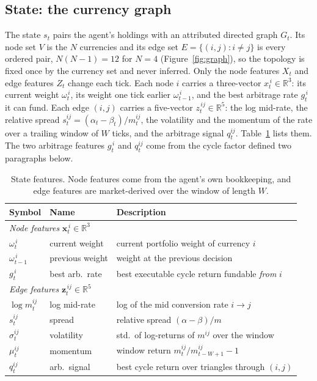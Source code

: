 \documentclass[12pt,a4paper]{article}
\begin{document}
\subsection{State: the currency graph}

The state $s_t$ pairs the agent's holdings with an attributed directed graph $G_t$. Its node set
$V$ is the $N$ currencies and its edge set $E=\{(i,j):i\neq j\}$ is every ordered pair,
$N(N-1)=12$ for $N=4$ (Figure~\ref{fig:graph}), so the topology is fixed once by the currency set
and never inferred. Only the node features $X_t$ and edge features $Z_t$ change each tick. Each node $i$ carries a three-vector $x_t^{\,i}\in\mathbb{R}^{3}$: its current weight
$\omega_t^{\,i}$, its weight one tick earlier $\omega_{t-1}^{\,i}$, and the best arbitrage rate
$g_t^{\,i}$ it can fund. Each edge $(i,j)$ carries a five-vector $z_t^{\,ij}\in\mathbb{R}^{5}$:
the log mid-rate, the relative spread $s_t^{ij}=(\alpha_t-\beta_t)/m_t^{ij}$, the volatility and
the momentum of the rate over a trailing window of $W$ ticks, and the arbitrage signal
$q_t^{ij}$. Table~\ref{tab:features} lists them. The two
arbitrage features $g_t^{\,i}$ and $q_t^{ij}$ come from the cycle factor defined two paragraphs
below.

\begin{table}[t]
\centering
\caption{State features. Node features come from the agent's own bookkeeping, and edge features
are market-derived over the window of length $W$.}
\label{tab:features}
\begin{tabular}{llp{8.0cm}}
\toprule
Symbol & Name & Description \\
\midrule
\multicolumn{3}{l}{\emph{Node features} $\mathbf{x}_t^{\,i}\in\mathbb{R}^3$}\\
$\omega_t^{\,i}$     & current weight  & current portfolio weight of currency $i$ \\
$\omega_{t-1}^{\,i}$ & previous weight & weight at the previous decision \\
$g_t^{\,i}$          & best arb.\ rate & best executable cycle return fundable \emph{from} $i$ \\
\midrule
\multicolumn{3}{l}{\emph{Edge features} $\mathbf{z}_t^{\,ij}\in\mathbb{R}^5$}\\
$\log m_t^{ij}$ & log mid-rate & log of the mid conversion rate $i\!\to\!j$ \\
$s_t^{ij}$      & spread       & relative spread $(\alpha-\beta)/m$ \\
$\sigma_t^{ij}$ & volatility   & std.\ of log-returns of $m^{ij}$ over the window \\
$\mu_t^{ij}$    & momentum     & window return $m_t^{ij}/m_{t-W+1}^{ij}-1$ \\
$q_t^{ij}$      & arb.\ signal & best cycle return over triangles through $(i,j)$ \\
\bottomrule
\end{tabular}
\end{table}
\end{document}
